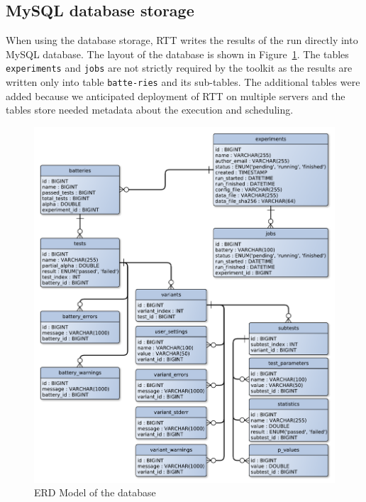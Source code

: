 \documentclass[
	digital,    %
	oneside,
	color,
	11pt,
	nocover,
	notable,
	nolof,
	nolot,
]{fithesis3}
\theoremstyle{definition}
\theoremstyle{remark}
\begin{document}
\subsection{MySQL database storage}
\label{sec:mysql_res_storage}
When using the database storage, RTT writes the results of the run directly into MySQL database. The layout of the database is shown in Figure~\ref{fig:erd_database}. The tables \texttt{experiments} and \texttt{jobs} are not strictly required by the toolkit as the results are written only into table \texttt{batte-\newline ries} and its sub-tables. The additional tables were added because we anticipated deployment of RTT on multiple servers and the tables store needed metadata about the execution and scheduling.

\begin{figure}[h!]
\begin{nomar}
\centering
\includegraphics[width=\paperwidth-3.5cm]{figures/database-erd-model.pdf}
\end{nomar}
\caption{ERD Model of the database}
\label{fig:erd_database}
\end{figure}
\end{document}
